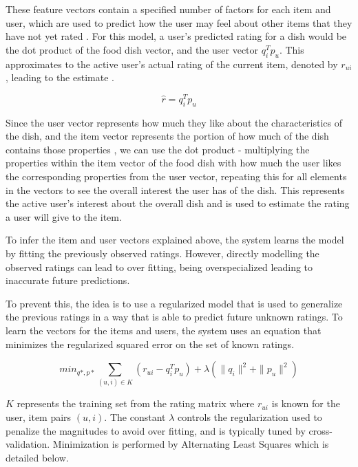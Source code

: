 These feature vectors contain a specified number of factors for each item and user, which are used to predict how the user may feel about other items that they have not yet rated \cite{koren2009matrix}. For this model, a user's predicted rating for a dish would be the dot product of the food dish vector, and the user vector \begin{math} q_{i}^T p_{u} \end{math}. This approximates to the active user's actual rating of the current item, denoted by \begin{math} r_{ui} \end{math}, leading to the estimate \cite{koren2009matrix}.

\begin{equation}\label{eq:1}\tag{1} \widehat{r} = q_{i}^T p_{u} \end{equation}

Since the user vector represents how much they like about the characteristics of the dish, and the item vector represents the portion of how much of the dish contains those properties \cite{koren2009matrix}, we can use the dot product - multiplying the properties within the item vector of the food dish with how much the user likes the corresponding properties from the user vector, repeating this for all elements in the vectors to see the overall interest the user has of the dish. This represents the active user's interest about the overall dish and is used to estimate the rating a user will give to the item. 

To infer the item and user vectors explained above, the system learns the model by fitting the previously observed ratings. However, directly modelling the observed ratings can lead to over fitting, being overspecialized leading to inaccurate future predictions.

To prevent this, the idea is to use a regularized model that is used to generalize the previous ratings in a way that is able to predict future unknown ratings. To learn the vectors for the items and users, the system uses an equation that minimizes the regularized squared error on the set of known ratings.

\begin{equation}\label{eq:2}\tag{2}
\displaystyle min_{q*,p*} \sum_{ (u,i) \in K} (r_{ui} - q_{i}^T p_{u}) + \lambda (\| q_{i} \|^2 + \| p_{u} \|^2 )
\end{equation}

\begin{math} K \end{math} represents the training set from the rating matrix where \begin{math} r_{ui} \end{math} is known for the user, item pairs \begin{math} (u,i) \end{math}. The constant \begin{math}\lambda\end{math} controls the regularization used to penalize the magnitudes to avoid over fitting, and is typically tuned by cross-validation. Minimization is performed by Alternating Least Squares \cite{koren2011}  which is detailed below. 

